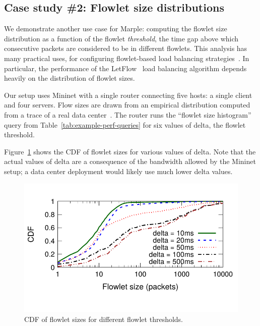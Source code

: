\subsection{Case study \#2: Flowlet size distributions}
\label{s:eval:mininet-flowlet}
\label{sec:eval:mininet-flowlet}

We demonstrate another use case for Marple: computing the flowlet size
distribution as a function of the flowlet \emph{threshold}, the time gap above
which consecutive packets are considered to be in different flowlets.  This
analysis has many practical uses, \eg for configuring flowlet-based load
balancing strategies~\cite{conga, letflow}.  In particular, the performance of
the LetFlow~\cite{letflow} load balancing algorithm depends heavily on the
distribution of flowlet sizes. 

Our setup uses Mininet with a single router connecting five hosts: a single
client and four servers. Flow sizes are drawn from an empirical distribution
computed from a trace of a real data center~\cite{empirical-flow-data}.  The
router runs the ``flowlet size histogram'' query from
Table~\ref{tab:example-perf-queries} for six values of {\ct delta}, the
flowlet threshold.

Figure~\ref{fig:flowletcdf} shows the CDF of flowlet sizes for various values
of {\ct delta}. Note that the actual values of {\ct delta} are a consequence of
the bandwidth allowed by the Mininet setup; a data center deployment would
likely use much lower {\ct delta} values.

\begin{figure}[!t]
\centering
\vspace{-0.2in}
\includegraphics[width=0.8\columnwidth]{pq_flowlet-cdf.pdf}
\vspace{-0.3in}
\caption{CDF of flowlet sizes for different flowlet thresholds.}
\vspace{-0.15in}
\label{fig:flowletcdf}
\end{figure}
